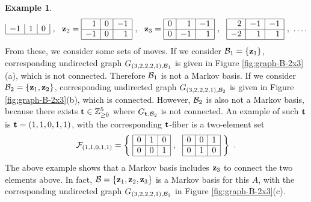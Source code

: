 \documentclass[12pt]{article}
\theoremstyle{definition}
\newtheorem{Example}[Theorem]{Example}
\def\Bt{{\bf t}}
\def\Bt{{\bf t}}
\def\Bz{{\bf z}}
\begin{document}
\begin{Example}
\[\begin{array}{|r|r|r|}
-1 & 1 & 0\\ \hline
\end{array}\ ,\ \  
\Bz_2 = \begin{array}{|r|r|r|}\hline
1 & 0 & -1\\ \hline
-1 & 0 & 1\\ \hline
\end{array}\ ,\ \  
\Bz_3 = \begin{array}{|r|r|r|}\hline
0 & 1 & -1 \\ \hline
0 & -1 & 1 \\ \hline
\end{array}\ ,\ \  
\begin{array}{|r|r|r|}\hline
2 & -1 & -1\\ \hline
-2 & 1 & 1\\ \hline
\end{array}\ ,\ \ldots. 
\]
From these, we consider some sets of moves. 
If we consider 
${\cal B}_1 = \{\Bz_1\}$, corresponding undirected graph
 $G_{(3,2,2,2,1), {\cal B}_1}$ is given in Figure \ref{fig:graph-B-2x3}(a),
 which is not connected. Therefore ${\cal B}_1$ is not a Markov
 basis. If we consider 
${\cal B}_2 = \{\Bz_1, \Bz_2\}$, corresponding undirected graph
 $G_{(3,2,2,2,1), {\cal B}_2}$ is given in Figure
 \ref{fig:graph-B-2x3}(b), which is connected. However, ${\cal B}_2$ is
 also not a Markov basis, because there exists $\Bt \in \mathbb{Z}_{\geq
 0}^5$ where $G_{\Bt, {\cal B}_2}$ is not connected. An example of such
 $\Bt$ is $\Bt = (1,1,0,1,1)$, with the corresponding $\Bt$-fiber is a
 two-element set
\begin{equation}
 {\cal F}_{(1,1,0,1,1)} = \left\{
\ \begin{array}{|r|r|r|}\hline
0 & 1 & 0\\ \hline
0 & 0 & 1\\ \hline
\end{array}\ ,\ \ 
\begin{array}{|r|r|r|}\hline
0 & 0 & 1\\ \hline
0 & 1 & 0\\ \hline
\end{array}\ 
\right\}\ .
\label{eqn:F-11011}
\end{equation}
The above example shows that a Markov basis includes $\Bz_3$ to connect
 the two elements above. In fact, ${\cal B} = \{\Bz_1, \Bz_2, \Bz_3\}$
 is a Markov basis for this $A$, with the corresponding 
undirected graph 
 $G_{(3,2,2,2,1), {\cal B}_3}$ in Figure
 \ref{fig:graph-B-2x3}(c).
\begin{figure}[htbp]

\end{figure}
\end{Example}
\end{document}
